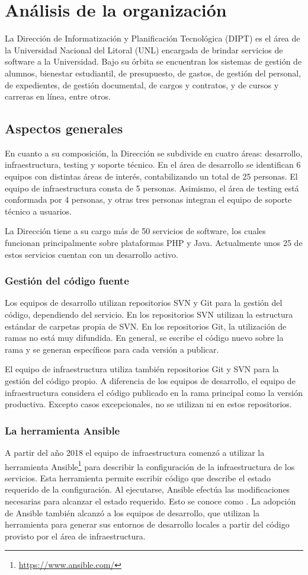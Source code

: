 %
%
%
\chapter{Análisis de la organización}
%
La Dirección de Informatización y Planificación Tecnológica (DIPT) es
el área de la Universidad Nacional del Litoral (UNL) encargada de
brindar servicios de software a la Universidad. Bajo su órbita se
encuentran los sistemas de gestión de alumnos, bienestar estudiantil,
de presupuesto, de gastos, de gestión del personal, de expedientes, de
gestión documental, de cargos y contratos, y de cursos y carreras en
línea, entre otros.
%
%
\section{Aspectos generales}
%
En cuanto a su composición, la Dirección se subdivide en cuatro áreas:
desarrollo, infraestructura, testing y soporte técnico. En el área de
desarrollo se identifican 6 equipos con distintas áreas de interés,
contabilizando un total de 25 personas. El equipo de infraestructura
consta de 5 personas. Asimismo, el área de testing está conformada por
4 personas, y otras tres personas integran el equipo de soporte
técnico a usuarios.

La Dirección tiene a su cargo más de 50 servicios de software, los
cuales funcionan principalmente sobre plataformas PHP y
Java. Actualmente unos 25 de estos servicios cuentan con un desarrollo
activo.
%
\subsection{Gestión del código fuente}
%
Los equipos de desarrollo utilizan repositorios SVN y Git para la
gestión del código, dependiendo del servicio. En los repositorios SVN
utilizan la estructura estándar de carpetas 
propia de SVN. En los repositorios Git, la utilización de ramas no
está muy difundida. En general, se escribe el código nuevo sobre la
rama  y se generan  específicos para cada versión a
publicar.

El equipo de infraestructura utiliza también repositorios Git y SVN
para la gestión del código propio. A diferencia de los equipos de
desarrollo, el equipo de infraestructura considera el código publicado
en la rama principal como la versión productiva. Excepto casos
excepcionales, no se utilizan  ni  en estos
repositorios.
%
\subsection{La herramienta Ansible}
%
A partir del año 2018 el equipo de infraestructura comenzó a utilizar
la herramienta Ansible\footnote{\url{https://www.ansible.com/}} para
describir la configuración de la infraestructura de los
servicios. Esta herramienta permite escribir código que describe el
estado requerido de la configuración. Al ejecutarse, Ansible efectúa
las modificaciones necesarias para alcanzar el estado requerido. Esto
se conoce como . La adopción de Ansible
también alcanzó a los equipos de desarrollo, que utilizan la
herramienta para generar sus entornos de desarrollo locales a partir
del código provisto por el área de infraestructura.
%
